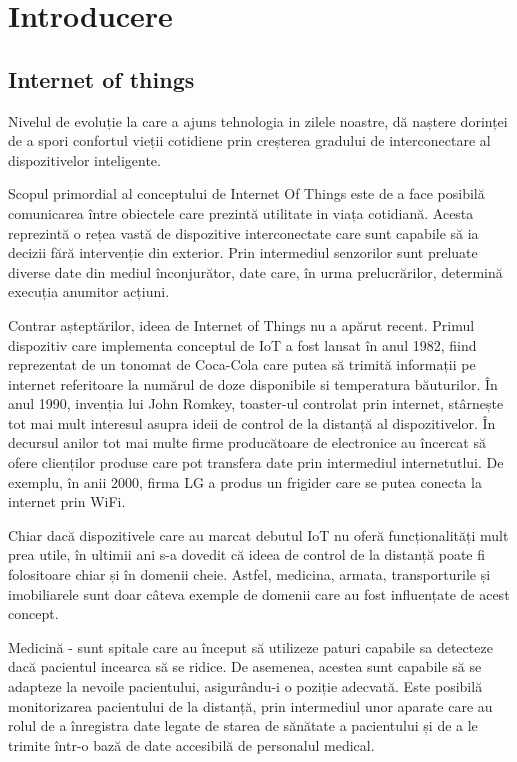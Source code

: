 \chapter{Introducere}\label{ch:1intro}

\section{Internet of things}
	Nivelul de evoluție la care a ajuns tehnologia in zilele noastre, dă naștere dorinței de a spori confortul vieții cotidiene prin creșterea gradului de interconectare al dispozitivelor inteligente.

	Scopul primordial al conceptului de Internet Of Things este de a face posibilă comunicarea între obiectele care prezintă utilitate in viața cotidiană. Acesta reprezintă o rețea vastă de dispozitive interconectate care sunt capabile să ia decizii fără intervenție din exterior. Prin intermediul senzorilor sunt preluate diverse date din mediul înconjurător, date care, în urma prelucrărilor, determină execuția anumitor acțiuni.

	Contrar așteptărilor, ideea de Internet of Things nu a apărut recent. Primul dispozitiv care implementa conceptul de IoT a fost lansat în anul 1982, fiind reprezentat de un tonomat de Coca-Cola care putea să trimită informații pe internet referitoare la numărul de doze disponibile si temperatura băuturilor. În anul 1990, invenția lui John Romkey, toaster-ul controlat prin internet, stârnește tot mai mult interesul asupra ideii de control de la distanță al dispozitivelor. În decursul anilor tot mai multe firme producătoare de electronice au încercat să ofere clienților produse care pot transfera date prin intermediul internetutlui. De exemplu, în anii 2000, firma LG a produs un frigider care se putea conecta la internet prin WiFi.

	Chiar dacă dispozitivele care au marcat debutul IoT nu oferă funcționalități mult prea utile, în ultimii ani s-a dovedit că ideea de control de la distanță poate fi folositoare chiar și în domenii cheie. Astfel, medicina, armata, transporturile și imobiliarele sunt doar câteva exemple de domenii care au fost influențate de acest concept.  

	Medicină - sunt spitale care au început să utilizeze paturi capabile sa detecteze dacă pacientul incearca să se ridice. De asemenea, acestea sunt capabile să se adapteze la nevoile pacientului, asigurându-i o poziție adecvată. Este posibilă monitorizarea pacientului de la distanță, prin intermediul unor aparate care au rolul de a înregistra date legate de starea de sănătate a pacientului și de a le trimite într-o bază de date accesibilă de personalul medical.


